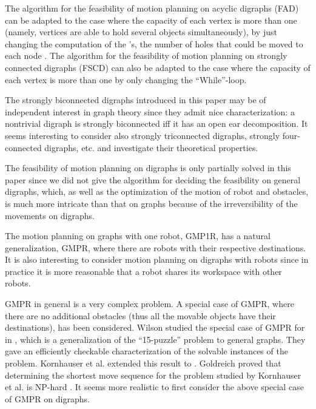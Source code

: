 \documentclass{article}
\begin{document}
The algorithm for the feasibility of motion planning on acyclic
digraphs (FAD) can be adapted to the case where the capacity of each
vertex is more than one (namely, vertices are able to hold several
objects simultaneously), by just changing the computation of the
's, the number of holes that could be moved to each node .
The algorithm for the feasibility of motion planning on strongly
connected digraphs (FSCD) can also be adapted to the case where the
capacity of each vertex is more than one by only changing the
``While''-loop.

The strongly biconnected digraphs introduced in this paper may be of
independent interest in graph theory since they admit nice
characterization: a nontrivial digraph is strongly biconnected iff
it has an open ear decomposition. It seems interesting to consider
also strongly triconnected digraphs, strongly four-connected
digraphs, etc. and investigate their theoretical properties.

The feasibility of motion planning on digraphs is only partially
solved in this paper since we did not give the algorithm for
deciding the feasibility on general digraphs, which, as well as the
optimization of the motion of robot and obstacles, is much more
intricate than that on graphs because of the irreversibility of the
movements on digraphs.

The motion planning on graphs with one robot, GMP1R, has a natural
generalization, GMPR, where there are  robots with their
respective destinations. It is also interesting to consider motion
planning on digraphs with  robots since in practice it is more
reasonable that a robot shares its workspace with other robots.

GMPR in general is a very complex problem. A special case of
GMPR, where there are no additional obstacles (thus all the
movable objects have their destinations), has been considered.
Wilson studied the special case of GMPR for  in
\cite{Wilson74}, which is a generalization of the ``15-puzzle''
problem to general graphs. They gave an efficiently checkable
characterization of the solvable instances of the problem.
Kornhauser et al. extended this result to 
\cite{KornhauserMS84}. Goldreich proved that determining the
shortest move sequence for the problem studied by Kornhauser et al.
is NP-hard \cite{Goldreich84}. It seems more realistic to first
consider the above special case of GMPR on digraphs.


\end{document}
